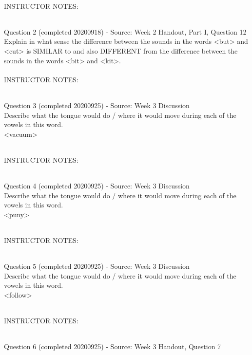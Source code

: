 \documentclass[12pt]{article}
\begin{document}
~\\
INSTRUCTOR NOTES: 


~\\

{\large Question 2} (completed 20200918) - Source: Week 2 Handout, Part I, Question 12\\

Explain in what sense the difference between the sounds in the words <but> and <cut> is SIMILAR to and also DIFFERENT from the difference between the sounds in the words <bit> and <kit>.\\


~\\
INSTRUCTOR NOTES: 


~\\

{\large Question 3} (completed 20200925) - Source: Week 3 Discussion\\

Describe what the tongue would do / where it would move during each of the vowels in this word.\\

<vacuum>


~\\
INSTRUCTOR NOTES: 


~\\

{\large Question 4} (completed 20200925) - Source: Week 3 Discussion\\

Describe what the tongue would do / where it would move during each of the vowels in this word.\\

<puny>


~\\
INSTRUCTOR NOTES: 


~\\

{\large Question 5} (completed 20200925) - Source: Week 3 Discussion\\

Describe what the tongue would do / where it would move during each of the vowels in this word.\\

<follow>


~\\
INSTRUCTOR NOTES: 


~\\

{\large Question 6} (completed 20200925) - Source: Week 3 Handout, Question 7\\
\end{document}
